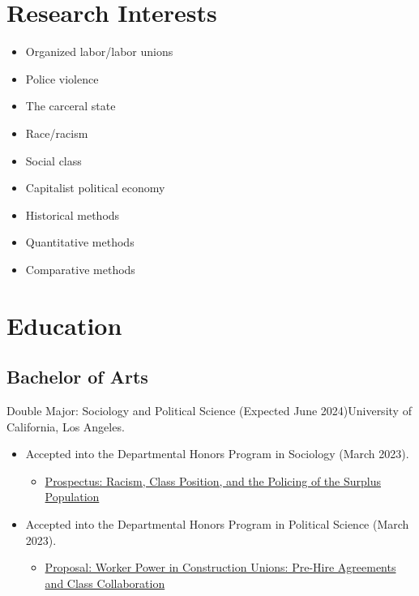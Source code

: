 \documentclass[
]{article}
\author{}
\date{\vspace{-2.5em}}
\providecommand{\tightlist}{%
  \setlength{\itemsep}{0pt}\setlength{\parskip}{0pt}}
\begin{document}
\section{Research Interests}

\begin{multicols}{3}
  \begin{itemize}[itemsep=1pt]
    \item Organized labor/labor unions
    \item Police violence
    \item The carceral state
    \item Race/racism
    \item Social class
    \item Capitalist political economy
    \item Historical methods
    \item Quantitative methods
    \item Comparative methods
  \end{itemize}
\end{multicols}

\section{Education}

\hypertarget{bachelor-of-arts}{%
\subsection{Bachelor of Arts}\label{bachelor-of-arts}}

Double Major: Sociology and Political Science \hfill (Expected June
2024)\newline University of California, Los Angeles.

\begin{itemize}
\tightlist
\item
  Accepted into the Departmental Honors Program in Sociology (March
  2023).

  \begin{itemize}
  \tightlist
  \item
    \href{https://matthewacarson.github.io/pdfs/Final-draft-Prospectus.pdf}{Prospectus:
    Racism, Class Position, and the Policing of the Surplus Population}
  \end{itemize}
\item
  Accepted into the Departmental Honors Program in Political Science
  (March 2023).

  \begin{itemize}
  \tightlist
  \item
    \href{https://matthewacarson.github.io/pdfs/Proposal-Website-Version.pdf}{Proposal:
    Worker Power in Construction Unions: Pre-Hire Agreements and Class
    Collaboration}
  \end{itemize}
\end{itemize}
\end{document}
